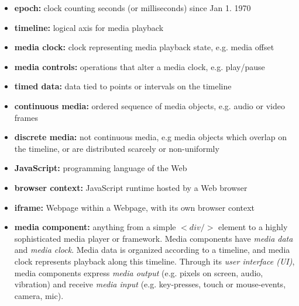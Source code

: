 \begin{itemize}
\item{\textbf{epoch:} clock counting seconds (or milliseconds) since Jan 1. 1970}
\item{\textbf{timeline:} logical axis for media playback}
\item{\textbf{media clock:} clock representing media playback state, e.g. media offset}
\item{\textbf{media controls:} operations that alter a media clock, e.g. play/pause}
\item{\textbf{timed data:} data tied to points or intervals on the timeline}
\item{\textbf{continuous media:} ordered sequence of media objects, e.g. audio or video frames}
\item{\textbf{discrete media:} not continuous media, e.g media objects which overlap on the timeline, or are distributed scarcely or non-uniformly}
\item{\textbf{JavaScript:} programming language of the Web}
\item{\textbf{browser context:} JavaScript runtime hosted by a Web browser}
\item{\textbf{iframe:} Webpage within a Webpage, with its own browser context}
\item{\textbf{media component:} anything from a simple $<div/>$ element to a highly sophisticated media player or framework. Media components have \emph{media data} and \emph{media clock}. Media data
is organized according to a timeline, and media clock represents playback along
this timeline. Through its \emph{user interface (UI)}, media components
express \emph{media output} (e.g. pixels on screen, audio, vibration) and
receive \emph{media input} (e.g. key-presses, touch or mouse-events, camera, mic).}
\end{itemize}